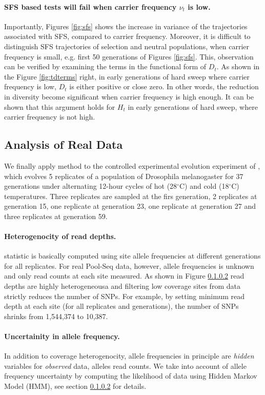 \documentclass[11pt]{article}
\def\comale{\text{COMALE }}
\begin{document}
\paragraph{SFS based tests will fail when carrier frequency $\nu_t$ is low.}
Importantly,  Figures \ref{fig:sfs} shows the increase in variance of the trajectories associated with SFS, compared to carrier frequency. Moreover, it is difficult to distinguish SFS trajectories of selection and neutral populations, when carrier frequency is small, e.g. first 50 generations of Figures \ref{fig:sfs}.
This, observation can be verified by examining the terms in the functional form of $D_t$.
As shown in the Figure 
\ref{fig:tdterms} right, in early 
generations of hard sweep where carrier frequency is low, 
$D_t$ is either 
positive or close zero. In other words, the reduction in 
diversity become 
significant when carrier frequency is high enough.
It can be shown that this argument holds for $H_t$ in early generations 
of hard sweep, where carrier frequency is not high.




\subsection{Analysis of Real Data}
We finally apply \comale method to the controlled experimental evolution 
experiment 
of \cite{orozco2012adaptation}, which evolves 5 replicates of a population of 
Drosophila melanogaster for 37 generations under alternating 12-hour cycles of 
hot (28$^{\circ}$C) and cold (18$^{\circ}$C) temperatures. Three replicates are 
sampled at the firs generation, 2 replicates at generation 15, one replicate at 
generation 23, one replicate at generation 27 and three replicates at 
generation 59.
\paragraph{Heterogenocity of read depths.} \comale statistic is basically 
computed using site allele frequencies at different generations for all 
replicates. For real Pool-Seq data, however, allele frequencies is unknown and 
only read counts at each site measured. As shown in Figure \ref{} read depths 
are highly heterogeneousa and filtering low coverage sites from data strictly 
reduces the number of SNPs. For example, by setting minimum read depth at 
each site (for all replicates and generations), the number of SNPs shrinks from 
1,544,374 to 10,387. 

\paragraph{Uncertainity in allele frequency.} In addition to coverage 
heterogenocity, 
allele frequencies in principle are 
\emph{hidden} variables for \emph{observed} data, alleles read counts. We 
take into account of allele frequency uncertainty by computing the likelihood 
of data using Hidden Markov Model (HMM), see section \ref{} for details.
\end{document}
